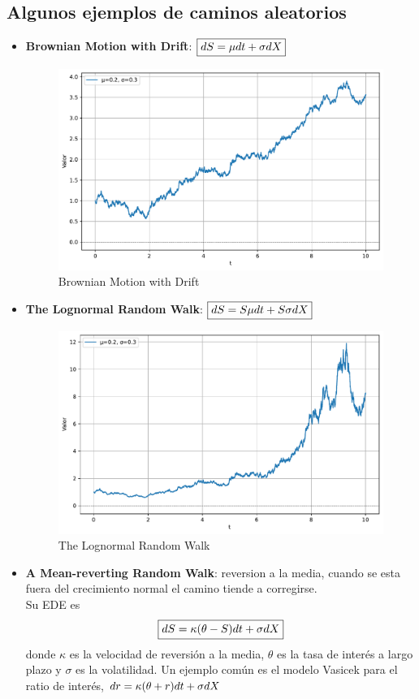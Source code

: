\subsection{Algunos ejemplos de caminos aleatorios}

\begin{itemize}
    \item \textbf{Brownian Motion with Drift}: $\boxed{dS = \mu dt + \sigma d\mathnormal{X}}$
    \begin{figure}[H]
        \centering
        \includegraphics[width=0.65\linewidth]{Imagenes/Parte1/3_Aleatoriedad/BrownianMotionDrift.pdf}
        \caption{Brownian Motion with Drift}
    \end{figure}
    \item \textbf{The Lognormal Random Walk}: $\boxed{dS = S\mu dt + S\sigma d\mathnormal{X}}$
    \begin{figure}[H]
        \centering
        \includegraphics[width=0.65\linewidth]{Imagenes/Parte1/3_Aleatoriedad/LognormalRandomWalk.pdf}
        \caption{The Lognormal Random Walk}
    \end{figure}
    \item \textbf{A Mean-reverting Random Walk}: reversion a la media, cuando se esta fuera del crecimiento normal el camino tiende a corregirse.\\
    Su EDE es 
    \[
        \boxed{dS = \kappa(\theta-S) dt + \sigma d\mathnormal{X}}
    \]
    donde $\kappa$ es la velocidad de reversión a la media, $\theta$ es la tasa de interés a largo plazo y $\sigma$ es la volatilidad. Un ejemplo común es el modelo Vasicek para el ratio de interés, $dr = \kappa(\theta+r) dt + \sigma d\mathnormal{X}$

\end{itemize}
